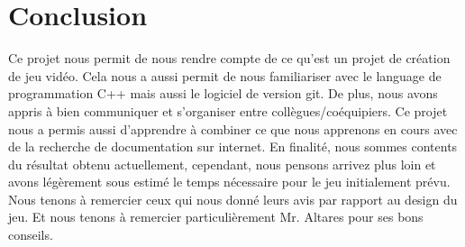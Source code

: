 \section{Conclusion}
Ce projet nous permit de nous rendre compte de ce qu'est un projet de création de jeu vidéo.
Cela nous a aussi permit de nous familiariser avec le language de programmation C++ mais aussi le logiciel de version git.
De plus, nous avons appris à bien communiquer et s'organiser entre collègues/coéquipiers.
Ce projet nous a permis aussi d'apprendre à combiner ce que nous apprenons en cours avec de la recherche de documentation sur internet.
En finalité, nous sommes contents du résultat obtenu actuellement, cependant, nous pensons arrivez plus loin et avons légèrement sous estimé le temps nécessaire pour le jeu initialement prévu.
Nous tenons à remercier ceux qui nous donné leurs avis par rapport au design du jeu.
Et nous tenons à remercier particulièrement Mr. Altares pour ses bons conseils.
